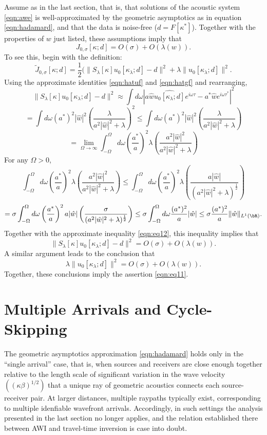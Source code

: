 Assume as in the last section, that is, that solutions
of the acoustic system \ref{eqn:awe} is well-approximated by the
geometric asymptotics as in equation \ref{eqn:hadamard}, and that the
data is noise-free ($d=F[\kappa^*]$). Together with the properties of $w$
just listed, these assumptions imply that
\begin{equation}
  \label{eqn:eq11}
  J_{0,\sigma}[\kappa;d] = O(\sigma) + O(\lambda(w)).
\end{equation}
To see this, begin with the definition:
\[
  \tilde{J}_{0,\sigma}[\kappa;d] = \frac{1}{2}
  (\|S_{\lambda}[\kappa]u_0[\kappa_{\lambda};d]-d\|^2 + \lambda \|u_0[\kappa_{\lambda};d]\|^2.
\]
Using the approximate identities \ref{eqn:hatuf} and \ref{eqn:hatgf} and
rearranging,
\[
\|S_{\lambda}[\kappa]u_0[\kappa_{\lambda};d]-d\|^2 
  \approx \int d\omega
  |a\hat{w}\hat{u_0[\kappa_{\lambda};d]}e^{i\omega\tau}-a^*\hat{w}e^{i\omega\tau^*}|^2
\]
\[
  = \int d\omega
  (a^*)^2|\hat{w}|^2\left(\frac{\lambda}{a^2|\hat{w}|^2 +
      \lambda}\right)^2   
\le \int d\omega (a^*)^2|\hat{w}|^2
  \left(\frac{\lambda}{a^2|\hat{w}|^2 + \lambda}\right)
\]
\begin{equation}
  \label{eqn:eq12}
  = \lim_{\Omega \rightarrow \infty} \int_{-\Omega}^{\Omega} d\omega \left(\frac{a^*}{a}\right)^2\lambda
  \left(\frac{a^2|\hat{w}|^2}{a^2|\hat{w}|^2 + \lambda}\right)
\end{equation}
For any $\Omega > 0$,
\[
\int_{-\Omega}^{\Omega} d\omega \left(\frac{a^*}{a}\right)^2\lambda\left(\frac{a^2|\hat{w}|^2}{a^2|\hat{w}|^2 + \lambda}\right)
\le \int_{-\Omega}^{\Omega} d\omega \left(\frac{a^*}{a}\right)^2 \lambda
  \left(\frac{ a|\hat{w}|}{(a^2|\hat{w}|^2 +
      \lambda)^{\frac{1}{2}}}\right)
\]
\[
  = \sigma \int_{-\Omega}^{\Omega} d\omega \left(\frac{a^*}{a}\right)^2 a|\hat{w}|
  \left(\frac{\sigma }{(a^2|\hat{w}|^2 +\lambda)^{\frac{1}{2}}}\right)
  \le \sigma \int_{-\Omega}^{\Omega} d\omega \frac{(a^*)^2}{a}
  |\hat{w}|
  \le \sigma \frac{(a^*)^2}{a} \|\hat{w}\|_{L^1(\bR)}.
\]
Together with the approximate inequality \ref{eqn:eq12}, this
inequality implies
that
\[
  \|S_{\lambda}[\kappa]u_0[\kappa_{\lambda};d] - d\|^2 = O(\sigma) + O(\lambda(w)).
\]
A similar argument leads to the conclusion that
\[
  \lambda\|u_0[\kappa_{\lambda};d]\|^2 = O(\sigma) + O(\lambda(w)).
\]
Together, these conclusions imply the assertion \ref{eqn:eq11}.


\section{Multiple Arrivals and Cycle-Skipping}
The geometric asymptotics approximation \ref{eqn:hadamard} holds only
in the ``single arrival'' case, that is, when sources and receivers
are close enough together relative to the length scale of significant
variation in the wave velocity $((\kappa\beta)^{1/2})$ that a unique ray of
geometric acoustics connects each source-receiver pair. At larger
distances, multiple raypaths typically exist, corresponding to
multiple idenfiable wavefront arrivals. Accordingly, in such settings
the analysis presented in the last section no longer applies, and the
relation established there between AWI and travel-time inversion is
case into doubt.

